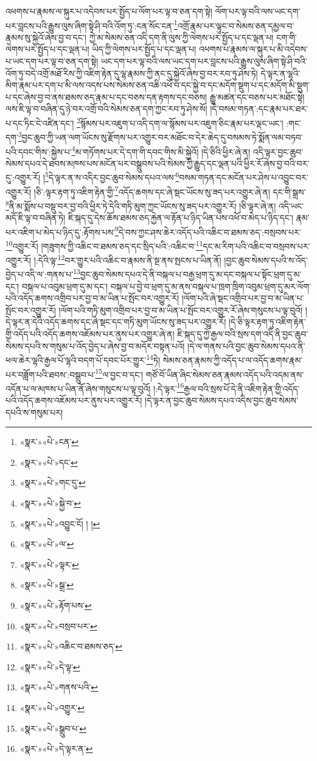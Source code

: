 འཕགས་པ་རྣམས་ལ་སྐུར་པ་འདེབས་པར་སྤྱོད་པ་ལོག་པར་ལྟ་བ་ཅན་དག་སྟེ། ལོག་པར་ལྟ་བའི་ལས་ཡང་དག་པར་བླངས་པའི་རྒྱུས་ལུས་ཞིག་སྟེ་ཤི་བའི་འོག་ཏུ་:ངན་སོང་ངན་\footnote{«སྣར་»«པེ་»ངན་}འགྲོ་རྣམ་པར་ལྟུང་བ་སེམས་ཅན་དམྱལ་བ་རྣམས་སུ་སྐྱེའོ་ཞེས་བྱ་བ་དང་། ཀྱེ་མ་སེམས་ཅན་འདི་དག་ནི་ལུས་ཀྱི་ལེགས་པར་སྤྱོད་པ་དང་ལྡན་པ། ངག་གི་ལེགས་པར་སྤྱོད་པ་དང་ལྡན་པ། ཡིད་ཀྱི་ལེགས་པར་སྤྱོད་པ་དང་ལྡན་པ། འཕགས་པ་རྣམས་ལ་སྐུར་པ་མི་འདེབས་པ་ཡང་དག་པར་ལྟ་བ་ཅན་དག་སྟེ། ཡང་དག་པར་ལྟ་བའི་ལས་ཡང་དག་པར་བླངས་པའི་རྒྱུས་ལུས་ཞིག་སྟེ་ཤི་བའི་འོག་ཏུ་བདེ་འགྲོ་མཐོ་རིས་ཀྱི་འཇིག་རྟེན་དུ་ལྷ་རྣམས་ཀྱི་ནང་དུ་སྐྱེའོ་ཞེས་བྱ་བར་རབ་ཏུ་ཤེས་ཏེ། དེ་ལྟར་ན་ལྷའི་མིག་རྣམ་པར་དག་པ་མི་ལས་འདས་པས་སེམས་ཅན་འཆི་འཕོ་བ་དང་སྐྱེ་བ་དང་མདོག་སྡུག་པ་དང་མདོག་མི་སྡུག་པ་དང་ཞེས་བྱ་བ་ནས་ཐམས་ཅད་རྣམ་པ་དང་བཅས་དན་རྟགས་དང་བཅས། རྒྱུ་མཚན་དང་བཅས་པར་མཐོང་སྟེ། ལས་ཇི་ལྟ་བ་བཞིན་དུ་ཉེ་བར་འགྲོ་བའི་སེམས་ཅན་དག་ཀྱང་རབ་ཏུ་ཤེས་སོ། །དེ་བསམ་གཏན་:དང་རྣམ་པར་ཐར་པ་དང་ཏིང་ངེ་འཛིན་དང་། \footnote{«སྣར་»«པེ་»དང་}སྙོམས་པར་འཇུག་པ་འདི་དག་ལ་སྙོམས་པར་འཇུག་ཅིང་རྣམ་པར་ལྡང་ཡང་། :གང་དག་\footnote{«སྣར་»«པེ་»གང་དུ་}བྱང་ཆུབ་ཀྱི་ཡན་ལག་ཡོངས་སུ་རྫོགས་པར་འགྱུར་བར་མཐོང་བ་དེར་ཆེད་དུ་བསམས་ཏེ་སྨོན་ལམ་བཏབ་པའི་དབང་གིས་:སྐྱེས་པ་\footnote{«སྣར་»«པེ་»སྐྱེ་བ་}མ་གཏོགས་པར་དེ་དག་གི་དབང་གིས་མི་སྐྱེའོ། །དེ་ཅིའི་ཕྱིར་ཞེ་ན། འདི་ལྟར་བྱང་ཆུབ་སེམས་དཔའ་དེ་ཐབས་མཁས་པས་མངོན་པར་བསྒྲུབས་པའི་སེམས་ཀྱི་རྒྱུད་དང་ལྡན་པའི་ཕྱིར་རོ་ཞེས་བྱ་བའི་བར་དུ་:འགྱུར་རོ། །\footnote{«སྣར་»«པེ་»འབྱུང་ངོ། ། །}དེ་ལྟར་ན་ས་འདིར་བྱང་ཆུབ་སེམས་དཔའ་ལས་\footnote{«སྣར་»«པེ་»ལ་}བསམ་གཏན་དང་མངོན་པར་ཤེས་པ་འབྱུང་བར་འགྱུར་རོ། །ཅི་:ལྟར་རྟག་ཏུ་འཇིག་རྟེན་གྱི་\footnote{«སྣར་»«པེ་»ལྟར་}འདོད་ཆགས་དང་ཞེ་སྡང་ཡོངས་སུ་ཟད་པར་འགྱུར་ཞེ་ན། དང་གི་སྒྲས་\footnote{«སྣར་»«པེ་»སྒྲ་}ནི་མ་སྨོས་པ་བསྡུ་བར་བྱ་བའི་ཕྱིར་ཏེ་དེའི་གཏི་མུག་ཀྱང་ཡོངས་སུ་ཟད་པར་འགྱུར་རོ། །ཅི་ལྟར་ཞེ་ན། འདི་ཡང་མདོ་ཇི་ལྟ་བ་བཞིན་ཏེ། ཇི་སྐད་དུ་དེས་ཆོས་ཐམས་ཅད་རྐྱེན་ལ་རྟོན་པ་ཉིད་ཡིན་པས་འཕོ་བ་མེད་པ་ཉིད་དང་། རྣམ་པར་འཇིག་པ་མེད་པ་ཉིད་དུ་:རྟོགས་པས་\footnote{«སྣར་»«པེ་»རྟོག་པས་}དེ་བས་ཀྱང་ཤས་ཆེར་འདོད་པའི་འཆིང་བ་ཐམས་ཅད་:བསྲབས་པར་\footnote{«སྣར་»«པེ་»བསྲབ་པར་}འགྱུར་རོ། །གཟུགས་ཀྱི་འཆིང་བ་ཐམས་ཅད་དང་སྲིད་པའི་:འཆིང་བ་\footnote{«སྣར་»«པེ་»འཆིང་བ་ཐམས་ཅད་}དང་མ་རིག་པའི་འཆིང་བ་བསྲབས་པར་འགྱུར་རོ། །:དེའི་ལྟ་\footnote{«སྣར་»«པེ་»དེ་ལྟ་}བར་གྱུར་པའི་འཆིང་བ་རྣམས་ནི་སྔ་ནས་སྤངས་པ་ཡིན་ནོ། །བྱང་ཆུབ་སེམས་དཔའི་ས་འོད་བྱེད་པ་འདི་ལ་:གནས་པ་\footnote{«སྣར་»«པེ་»གནས་པའི་}བྱང་ཆུབ་སེམས་དཔའ་དེ་ནི་བསྐལ་པ་བརྒྱ་ཕྲག་དུ་མ་དང་བསྐལ་པ་སྟོང་ཕྲག་དུ་མ་དང་། བསྐལ་པ་འབུམ་ཕྲག་དུ་མ་དང་། བསྐལ་པ་བྱེ་བ་ཕྲག་དུ་མ་ནས་བསྐལ་པ་ཁྲག་ཁྲིག་འབུམ་ཕྲག་དུ་མར་ལོག་པའི་འདོད་ཆགས་འགྲིབ་པར་བྱ་བ་མ་ཡིན་པ་སྤོང་བར་འགྱུར་རོ། །ལོག་པའི་ཞེ་སྡང་འགྲིབ་པར་བྱ་བ་མ་ཡིན་པ་སྤོང་བར་འགྱུར་རོ། །ལོག་པའི་གཏི་མུག་འགྲིབ་པར་བྱ་བ་མ་ཡིན་པ་སྤོང་བར་འགྱུར་རོ་ཞེས་གསུངས་པ་ལྟ་བུའོ། །དེ་ལྟར་ན་དེའི་འདོད་ཆགས་དང་ཞེ་སྡང་དང་གཏི་མུག་ཡོངས་སུ་ཟད་པར་འགྱུར་རོ། །དེ་ཅི་ལྟར་རྟག་ཏུ་འཇིག་རྟེན་གྱི་འདོད་པའི་འདོད་ཆགས་འཇོམས་པར་ནུས་པར་འགྱུར་ཞེ་ན། ཇི་སྐད་དུ་ཀྱེ་རྒྱལ་བའི་སྲས་དག་འདི་ནི་བྱང་ཆུབ་སེམས་དཔའི་ས་གསུམ་པ་འོད་བྱེད་པ་ཞེས་བྱ་བ་མདོར་བསྟན་པའོ། །དེ་ལ་གནས་པའི་བྱང་ཆུབ་སེམས་དཔའ་ནི་ཕལ་ཆེར་ལྷའི་རྒྱལ་པོ་ལྷའི་བདག་པོ་དབང་པོར་གྱུར་\footnote{«སྣར་»«པེ་»འགྱུར་}ཏེ། སེམས་ཅན་རྣམས་ཀྱི་འདོད་པ་ལ་འདོད་ཆགས་རྣམ་པར་བཟློག་པའི་ཐབས་:བསྒྲུབ་པ་\footnote{«སྣར་»«པེ་»སྒྲུབ་པ་}ལ་བྱང་བ་དང་། གཙོ་བོ་ཡིན་ཞིང་སེམས་ཅན་རྣམས་འདོད་པའི་འདམ་ནས་འདོན་པ་ལ་མཁས་པ་ཡིན་ནོ་ཞེས་གསུངས་པ་ལྟ་བུའོ། །:དེ་ལྟར་\footnote{«སྣར་»«པེ་»དེ་ལྟར་ན་}རྒྱལ་བའི་སྲས་པོ་དེ་ནི་འཇིག་རྟེན་གྱི་འདོད་པའི་འདོད་ཆགས་འཇོམས་པར་ནུས་པར་འགྱུར་རོ། །དེ་ལྟར་ན་བྱང་ཆུབ་སེམས་དཔའ་འདིས་བྱང་ཆུབ་སེམས་དཔའི་ས་གསུམ་པར། 